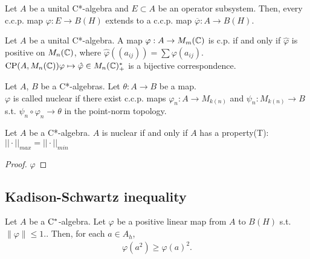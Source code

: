 \begin{theorem}
  Let $A$ be a unital C*-algebra and $E \subset A$ be an operator subsystem.
  Then, every c.c.p. map $\varphi : E \rightarrow B(H)$ extends to a c.c.p. map $\overline{\varphi} : A \rightarrow B(H)$.
\end{theorem}

\begin{proposition}
  Let $A$ be a unital C*-algebra.
  A map $\varphi:A \rightarrow M_m(\mathbb{C})$ is c.p. if and only if $\hat{\varphi}$ is positive on $M_n(\mathbb{C})$,
  where $\hat{\varphi}((a_{ij})) = \sum \varphi(a_{ij})$.\\
  ${\rm CP}(A,M_n(\mathbb{C})) \varphi \mapsto \hat{\varphi} \in M_n(\mathbb{C})_{+}^*$ is a bijective correspondence.
\end{proposition}

\begin{definition}[nuclear]
  Let $A$, $B$ be a C*-algebras.
  Let $\theta:A \rightarrow B$ be a map.\\
  $\varphi$ is called nuclear if there exist c.c.p. maps $\varphi_n : A \rightarrow M_{k(n)}$ and $\psi_n:M_{k(n)} \rightarrow B$ s.t. $\psi_n \circ \varphi_n \rightarrow \theta$ in the point-norm topology.
\end{definition}

\begin{theorem}
  Let $A$ be a C*-algebra.
  $A$ is nuclear if and only if $A$ has a property(T):$||\cdot||_{max} = ||\cdot||_{min}$
\end{theorem}

\begin{proof}
  $\varphi$ 
\end{proof}

\subsection{Kadison-Schwartz inequality}
\begin{theorem}
  Let $A$ be a $\rm{C}^*$-algebra.
  Let $\varphi$ be a positive linear map from $A$ to $B(H)$ s.t. $\|\varphi\| \leq 1$..
  Then, for each $a \in A_{h}$,
  \begin{align*}
    \varphi(a^2) \geq \varphi(a)^2.
  \end{align*}
\end{theorem}

